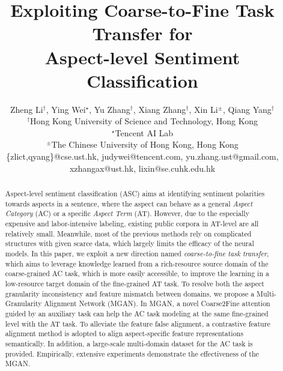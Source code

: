 \documentclass[letterpaper]{article} \usepackage{aaai19}  \usepackage{times}  \usepackage{latexsym}
\begin{document}
\title{Exploiting Coarse-to-Fine Task Transfer for \\ Aspect-level Sentiment Classification}


\author{Zheng Li$^{\dag}$, Ying Wei$^{\star}$, Yu Zhang$^{\dag}$, Xiang Zhang$^{\dag}$, Xin Li$^{\pm}$, Qiang Yang$^{\dag}$\\
$^{\dag}$Hong Kong University of Science and Technology, Hong Kong\\
$^{\star}$Tencent AI Lab\\
$^{\pm}$The Chinese University of Hong Kong, Hong Kong\\
\{zlict,qyang\}@cse.ust.hk, judywei@tencent.com, yu.zhang.ust@gmail.com, xzhangax@ust.hk, lixin@se.cuhk.edu.hk}
\maketitle

\begin{abstract}
Aspect-level sentiment classification (ASC) aims at identifying sentiment polarities towards aspects in a sentence, where the aspect can behave as a general {\it Aspect Category} (AC) or a specific {\it Aspect Term} (AT). However, due to the especially expensive and labor-intensive labeling, existing public corpora in AT-level are all relatively small. Meanwhile, most of the previous methods rely on complicated structures with given scarce data, which largely limits the efficacy of the neural models. In this paper, we exploit a new direction named {\it coarse-to-fine task transfer}, which aims to leverage knowledge learned from a rich-resource source domain of the coarse-grained AC task, which is more easily accessible, to improve the learning in a low-resource target domain of the fine-grained AT task. To resolve both the aspect granularity inconsistency and feature mismatch between domains, we propose a Multi-Granularity Alignment Network (MGAN). In MGAN, a novel Coarse2Fine attention guided by an auxiliary task can help the AC task modeling at the same fine-grained level with the AT task. To alleviate the feature false alignment, a contrastive feature alignment method is adopted to align aspect-specific feature representations semantically. In addition, a large-scale multi-domain dataset for the AC task is provided. Empirically, extensive experiments demonstrate the effectiveness of the MGAN. 
\vspace{-2.5mm}
\end{abstract}
\end{document}
